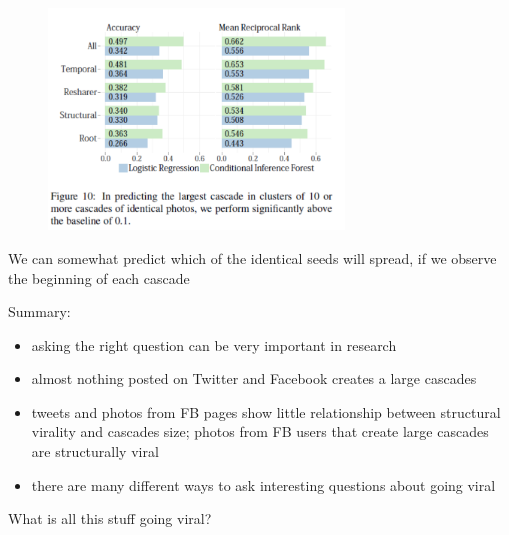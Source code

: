 \documentclass[aspectratio=169]{beamer}
\begin{document}
\begin{frame}

\begin{figure}
  \centering
  \includegraphics[width=0.7\textwidth]{figures/cheng_cascades_2014_fig10}
\end{figure}

We can somewhat predict which of the identical seeds will spread, if we observe the beginning of each cascade


\end{frame}
\begin{frame}

Summary:
\begin{itemize}
\item asking the right question can be very important in research
\pause
\item almost nothing posted on Twitter and Facebook creates a large cascades
\pause
\item tweets and photos from FB pages show little relationship between structural virality and cascades size; photos from FB users that create large cascades are structurally viral
\pause
\item there are many different ways to ask interesting questions about going viral 
\end{itemize}

\end{frame}
\begin{frame}

What is all this stuff going viral?  

\end{frame}
\end{document}
